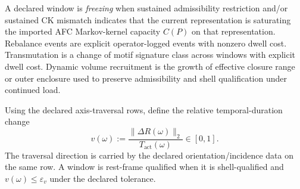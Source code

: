 \begin{definition}
\label{def:freeze-recruit}
A declared window is \emph{freezing} when sustained admissibility restriction and/or sustained CK mismatch indicates that the current representation is saturating the imported AFC Markov-kernel capacity $C(P)$ on that representation. Rebalance events are explicit operator-logged events with nonzero dwell cost. Transmutation is a change of motif signature class across windows with explicit dwell cost. Dynamic volume recruitment is the growth of effective closure range or outer enclosure used to preserve admissibility and shell qualification under continued load.
\end{definition}

\begin{definition}
\label{def:rest-frame-window}
Using the declared axis-traversal rows, define the relative temporal-duration change
\[
v(\omega):=\frac{\|\Delta R(\omega)\|_2}{T_{\mathrm{act}}(\omega)}\in[0,1].
\]
The traversal direction is carried by the declared orientation/incidence data on the same row. A window is rest-frame qualified when it is shell-qualified and $v(\omega)\le \varepsilon_v$ under the declared tolerance.
\end{definition}
